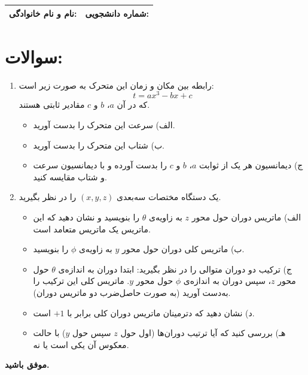 \documentclass[12pt,a4paper]{article}
\begin{document}
	
	\begin{tabular}{|p{7cm}|p{7cm}|}
		\hline
		\textbf{نام و نام خانوادگی:} & \textbf{شماره دانشجویی:} \\
		\hline
	\end{tabular}
	
	\section*{سوالات:}
	\begin{enumerate}
		\item 
		رابطه بین مکان و زمان این متحرک به صورت زیر است:
		\[
		t = a x^3 - b x + c
		\]
		که در آن \(a\)، \(b\) و \(c\) مقادیر ثابتی هستند.
		\begin{itemize}
			\item الف) سرعت این متحرک را بدست آورید.
			\item ب) شتاب این متحرک را بدست آورید.
			\item ج) دیمانسیون هر یک از ثوابت \(a\)، \(b\) و \(c\) را بدست آورده و با دیمانسیون سرعت و شتاب مقایسه کنید.
		\end{itemize}
		
		\vspace{0.8cm} %
		
		\item 
		یک دستگاه مختصات سه‌بعدی \((x, y, z)\) را در نظر بگیرید.
		\begin{itemize}
			\item الف) ماتریس دوران حول محور \(z\) به زاویه‌ی \(\theta\) را بنویسید و نشان دهید که این ماتریس یک ماتریس متعامد است.
			\item ب) ماتریس کلی دوران حول محور \(y\) به زاویه‌ی \(\phi\) را بنویسید.
			\item ج) ترکیب دو دوران متوالی را در نظر بگیرید: ابتدا دوران به اندازه‌ی \(\theta\) حول محور \(z\)، سپس دوران به اندازه‌ی \(\phi\) حول محور \(y\). ماتریس کلی این ترکیب را به‌دست آورید (به صورت حاصل‌ضرب دو ماتریس دوران).
			\item د) نشان دهید که دترمینان ماتریس دوران کلی برابر با \(+1\) است.
			\item هـ) بررسی کنید که آیا ترتیب دوران‌ها (اول حول \(z\) سپس حول \(y\)) با حالت معکوس آن یکی است یا نه.
		\end{itemize}
	\end{enumerate}
	
	\vspace{10pt}
	\textbf{موفق باشید.}
	
\end{document}
